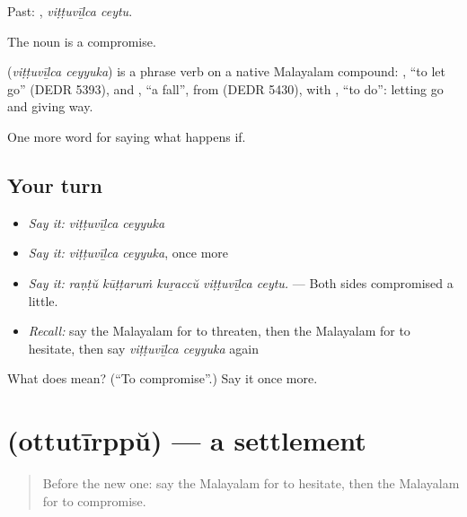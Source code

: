 Past:  , \emph{viṭṭuvīḻca ceytu}.

The noun  is a compromise.

\begin{cousinweb}
\textbf{ } (\emph{viṭṭuvīḻca ceyyuka}) is a phrase verb on a native Malayalam compound: , \textquotedblleft{}to let go\textquotedblright{} (DEDR 5393), and , \textquotedblleft{}a fall\textquotedblright{}, from  (DEDR 5430), with , \textquotedblleft{}to do\textquotedblright{}: letting go and giving way.
\end{cousinweb}

\begin{grammarlens}[title={What you've built}]
One more word for saying what happens if.
\end{grammarlens}

\subsection*{Your turn}
\begin{itemize}
\raggedright
  \item \emph{Say it:} \emph{viṭṭuvīḻca ceyyuka}
  \item \emph{Say it:} \emph{viṭṭuvīḻca ceyyuka}, once more
  \item \emph{Say it:} \emph{raṇṭŭ kūṭṭaruṁ kuṟaccŭ viṭṭuvīḻca ceytu.} — Both sides compromised a little.
  \item \emph{Recall:} say the Malayalam for to threaten, then the Malayalam for to hesitate, then say \emph{viṭṭuvīḻca ceyyuka} again
\end{itemize}

\begin{tcolorbox}[breakable,colback=teal!4,colframe=teal!35!black,title={Before you move on}]
What does   mean? (\textquotedblleft{}To compromise\textquotedblright{}.) Say it once more.
\end{tcolorbox}
\section[\texorpdfstring{\ml{ഒത്തുതീർപ്പ്} (ottutīrppŭ)}{ഒത്തുതീർപ്പ് (ottutīrppŭ)}]{ (ottutīrppŭ) — a settlement}

\label{lesson:ML-C452-ottutirppu}



\begin{quote}
Before the new one: say the Malayalam for to hesitate, then the Malayalam for to compromise.
\end{quote}

